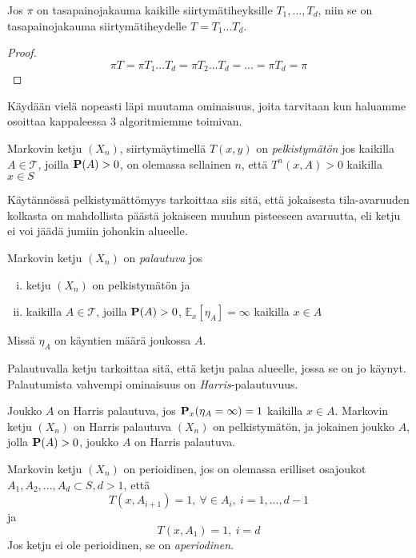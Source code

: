\begin{lause}\label{cyclic-kernel}
	Jos $\pi$ on tasapainojakauma kaikille siirtymätiheyksille $T_1,...,T_d$, niin se on tasapainojakauma siirtymätiheydelle $T = T_1...T_d$.
\end{lause}

\begin{proof}
	\begin{equation*}
		\pi T = \pi T_1...T_d = \pi T_2...T_d = ... = \pi T_d = \pi
	\end{equation*}
\end{proof}

Käydään vielä nopeasti läpi muutama ominaisuus, joita tarvitaan kun haluamme osoittaa kappaleessa 3 algoritmiemme toimivan.

\begin{maar}
	Markovin ketju $(X_n)$, siirtymäytimellä $T(x,y)$ on \textit{pelkistymätön} jos kaikilla $A \in \mathcal{T}$, joilla $\textbf{P}(A)>0$, on olemassa sellainen $n$, että $T^n(x, A)>0$ kaikilla $x\in S$
\end{maar} 

Käytännössä pelkistymättömyys tarkoittaa siis sitä, että jokaisesta tila-avaruuden kolkasta on mahdollista päästä jokaiseen muuhun pisteeseen avaruutta, eli ketju ei voi jäädä jumiin johonkin alueelle.

\begin{maar}
	Markovin ketju $(X_n)$ on \textit{palautuva} jos
	\begin{enumerate}[(i)]
		\item ketju $(X_n)$ on pelkistymätön ja
		\item kaikilla $A\in \mathcal{T}$, joilla $\textbf{P}(A)>0$, $\mathbb{E}_x [\eta_A]=\infty$ kaikilla $x\in A$
	\end{enumerate}
	Missä $\eta_A$ on käyntien määrä joukossa $A$.
\end{maar}

Palautuvalla ketju tarkoittaa sitä, että ketju palaa alueelle, jossa se on jo käynyt. Palautumista vahvempi ominaisuus on \textit{Harris}-palautuvuus.

\begin{maar}
	Joukko $A$ on Harris palautuva, jos $\textbf{P}_x(\eta_A =\infty) = 1$ kaikilla $x\in A$. Markovin ketju $(X_n)$ on Harris palautuva $(X_n)$ on pelkistymätön, ja jokainen joukko $A$, jolla $\textbf{P}(A)>0$, joukko $A$ on Harris palautuva.
\end{maar}

\begin{maar}
	Markovin ketju $(X_n)$ on perioidinen, jos on olemassa erilliset osajoukot $A_1, A_2,...,A_d \subset S, d > 1$, että 
	\begin{equation}
		T(x, A_{i+1}) = 1 , \: \forall \in A_i, \: i=1,...,d-1
	\end{equation}
	ja 
	\begin{equation}
		T(x,A_1)=1, \: i = d
	\end{equation}
	Jos ketju ei ole perioidinen, se on \textit{aperiodinen}.
\end{maar}

